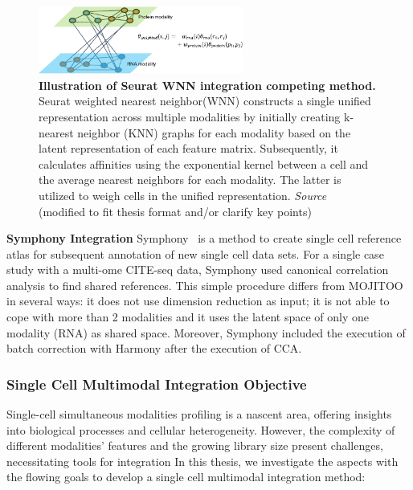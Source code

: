 \begin{description}
  \begin{figure}[!ht]
  	\centering
  	\includegraphics[width=0.60\textwidth]{Alg_WNN/fig}
  	\vspace{0.1cm}
  	\caption[Illustration of Seurat WNN integration competing method.]{\textbf{Illustration of Seurat WNN integration competing method.} Seurat weighted nearest neighbor(WNN) constructs a single unified representation across multiple modalities by initially creating k-nearest neighbor (KNN) graphs for each modality based on the latent representation of each feature matrix. Subsequently, it calculates affinities using the exponential kernel between a cell and the average nearest neighbors for each modality. The latter is utilized to weigh cells in the unified representation. \emph{Source~\cite{hao2021seurat4}} (modified to fit thesis format and/or clarify key points)
  }
  	\label{fig:Alg_WNN}
  \end{figure}

  \item \textbf{Symphony Integration}
  Symphony~\citep{kang2021symphony} is a method to create single cell reference atlas for subsequent annotation of new single cell data sets. For a single case study with a multi-ome CITE-seq data, Symphony used canonical correlation analysis to find shared references. This simple procedure differs from MOJITOO in several ways: it does not use dimension reduction as input; it is not able to cope with more than 2 modalities and it uses the latent space of only one modality (RNA) as shared space. Moreover, Symphony included the execution of batch correction with Harmony after the execution of CCA.

\end{description}


\subsubsection{Single Cell Multimodal Integration Objective}
Single-cell simultaneous modalities profiling is a nascent area, offering insights into biological processes and cellular heterogeneity. However, the complexity of different modalities' features and the growing library size present challenges, necessitating tools for integration In this thesis, we investigate the aspects with the flowing goals to develop a single cell multimodal integration method:

